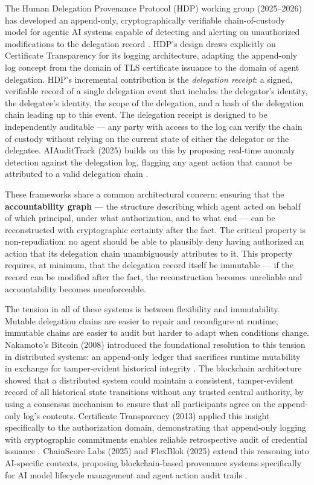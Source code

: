 The Human Delegation Provenance Protocol (HDP) working group (2025–2026) has developed an append-only, cryptographically verifiable chain-of-custody model for agentic AI systems capable of detecting and alerting on unauthorized modifications to the delegation record \cite{hdp-draft,hdp-draft-2}. HDP's design draws explicitly on Certificate Transparency \cite{laurie2013certificate} for its logging architecture, adapting the append-only log concept from the domain of TLS certificate issuance to the domain of agent delegation. HDP's incremental contribution is the \textit{delegation receipt}: a signed, verifiable record of a single delegation event that includes the delegator's identity, the delegatee's identity, the scope of the delegation, and a hash of the delegation chain leading up to this event. The delegation receipt is designed to be independently auditable — any party with access to the log can verify the chain of custody without relying on the current state of either the delegator or the delegatee. AIAuditTrack (2025) builds on this by proposing real-time anomaly detection against the delegation log, flagging any agent action that cannot be attributed to a valid delegation chain \cite{aaudittrack2025arxiv}.

These frameworks share a common architectural concern: ensuring that the \textbf{accountability graph} — the structure describing which agent acted on behalf of which principal, under what authorization, and to what end — can be reconstructed with cryptographic certainty after the fact. The critical property is non-repudiation: no agent should be able to plausibly deny having authorized an action that its delegation chain unambiguously attributes to it. This property requires, at minimum, that the delegation record itself be immutable — if the record can be modified after the fact, the reconstruction becomes unreliable and accountability becomes unenforceable.

The tension in all of these systems is between flexibility and immutability. Mutable delegation chains are easier to repair and reconfigure at runtime; immutable chains are easier to audit but harder to adapt when conditions change. Nakamoto's Bitcoin (2008) introduced the foundational resolution to this tension in distributed systems: an append-only ledger that sacrifices runtime mutability in exchange for tamper-evident historical integrity \cite{nakamoto2008bitcoin}. The blockchain architecture showed that a distributed system could maintain a consistent, tamper-evident record of all historical state transitions without any trusted central authority, by using a consensus mechanism to ensure that all participants agree on the append-only log's contents. Certificate Transparency (2013) applied this insight specifically to the authorization domain, demonstrating that append-only logging with cryptographic commitments enables reliable retrospective audit of credential issuance \cite{laurie2013certificate}. ChainScore Labs (2025) and FlexBlok (2025) extend this reasoning into AI-specific contexts, proposing blockchain-based provenance systems specifically for AI model lifecycle management and agent action audit trails \cite{on_chain_provenance_ai,blockchain_ai_governance}.

